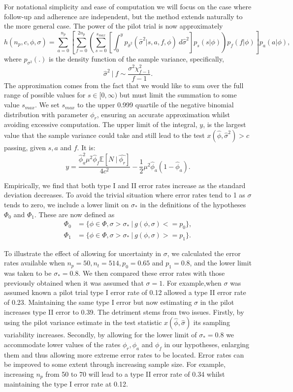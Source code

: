 \documentclass[AMA,STIX1COL]{WileyNJD-v2}
\begin{document}
For notational simplicity and ease of computation we will focus on the case where follow-up and adherence are independent, but the method extends naturally to the more general case. The power of the pilot trial is now approximately 
\begin{equation*}
h(n_p, c, \phi, \sigma) = \sum_{a=0}^{n_p} \left[  \sum_{f=0}^{2n_p} \left( \sum_{s = 0}^{s_{max}} 
\left[ \int_0^y p_{\hat{\sigma}^2}( \hat{\sigma}^2 | s, a, f, \phi) ~ d\hat{\sigma}^2 \right] 
p_s(s | \phi) \right) p_{f}(f |\phi)  \right] p_a(a | \phi),
\end{equation*}
where $p_{\sigma^2}(.)$ is the density function of the sample variance, specifically,
$$
\hat{\sigma}^2 ~|~  f \sim \frac{\sigma^2 \chi^2_{f - 1}}{f - 1}.
$$
The approximation comes from the fact that we would like to sum over the full range of possible values for $s \in [0, \infty)$ but must limit the summation to some value $s_{max}$. We set $s_{max}$ to the upper 0.999 quartile of the negative binomial distribution with parameter $\phi_r$, ensuring an accurate approximation whilst avoiding excessive computation. The upper limit of the integral, $y$, is the largest value that the sample variance could take and still lead to the test $x(\hat{\phi}, \hat{\sigma}^2) > c$ passing, given $s, a$ and $f$. It is:
$$
y = \frac{\hat{\phi}_a^2 \mu^2 \hat{\phi}_f \mathbb{E}[N ~|~ \hat{\phi_r}]}{4c^2} - \frac{1}{2} \mu^2 \hat{\phi}_a (1-\hat{\phi}_a).
$$
 
Empirically, we find that both type I and II error rates increase as the standard deviation decreases. To avoid the trivial situation where error rates tend to 1 as $\sigma$ tends to zero, we include a lower limit on $\sigma_*$ in the definitions of the hypotheses $\Phi_0$ and $\Phi_1$. These are now defined as
\begin{align*}
\Phi_0 &= \{\phi \in \Phi, \sigma > \sigma_*  ~ | ~ g(\phi, \sigma) <= p_0 \}, \\
\Phi_1 &= \{\phi \in \Phi, \sigma > \sigma_* ~ | ~ g(\phi, \sigma) >= p_1 \}.
\end{align*}

To illustrate the effect of allowing for uncertainty in $\sigma$, we calculated the error rates available when $n_p = 50, n_t = 514, p_0 = 0.65$ and $p_1 = 0.8$, and the lower limit was taken to be $\sigma_* = 0.8$. We then compared these error rates with those previously obtained when it was assumed that $\sigma = 1$. For example,when $\sigma$ was assumed known a pilot trial type I error rate of 0.12 allowed a type II error rate of 0.23. Maintaining the same type I error but now estimating $\sigma$ in the pilot increases type II error to 0.39. The detriment stems from two issues. Firstly, by using the pilot variance estimate in the test statistic $x(\hat{\phi}, \hat{\sigma})$ its sampling variability increases. Secondly, by allowing for the lower limit of $\sigma_* = 0.8$ we accommodate lower values of the rates $\phi_r, \phi_a$ and $\phi_f$ in our hypotheses, enlarging them and thus allowing more extreme error rates to be located. Error rates can be improved to some extent through increasing sample size. For example, increasing $n_p$ from 50 to 70 will lead to a type II error rate of 0.34 whilst maintaining the type I error rate at 0.12.
\end{document}
